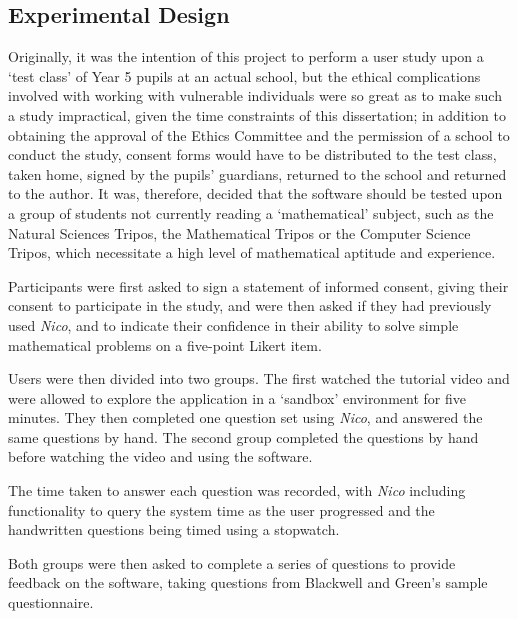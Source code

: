 \documentclass[12pt,twoside,notitlepage,xetex]{report}
\begin{document}
\subsection{Experimental Design}

Originally, it was the intention of this project to perform a user study upon a `test class' of Year 5 pupils at an actual school, but the ethical complications involved with working with vulnerable individuals were so great as to make such a study impractical, given the time constraints of this dissertation; in addition to obtaining the approval of the Ethics Committee and the permission of a school to conduct the study, consent forms would have to be distributed to the test class, taken home, signed by the pupils' guardians, returned to the school and returned to the author.  It was, therefore, decided that the software should be tested upon a group of students not currently reading a `mathematical' subject, such as the Natural Sciences Tripos, the Mathematical Tripos or the Computer Science Tripos, which necessitate a high level of mathematical aptitude and experience.

Participants were first asked to sign a statement of informed consent, giving their consent to participate in the study, and were then asked if they had previously used \emph{Nico}, and to indicate their confidence in their ability to solve simple mathematical problems on a five-point Likert item.

Users were then divided into two groups.  The first watched the tutorial video and were allowed to explore the application in a `sandbox' environment for five minutes.  They then completed one question set using \emph{Nico}, and answered the same questions by hand.  The second group completed the questions by hand before watching the video and using the software.

The time taken to answer each question was recorded, with \emph{Nico} including functionality to query the system time as the user progressed and the handwritten questions being timed using a stopwatch.

Both groups were then asked to complete a series of questions to provide feedback on the software, taking questions from Blackwell and Green's sample questionnaire. \cite{Blackwell2000}
\end{document}
